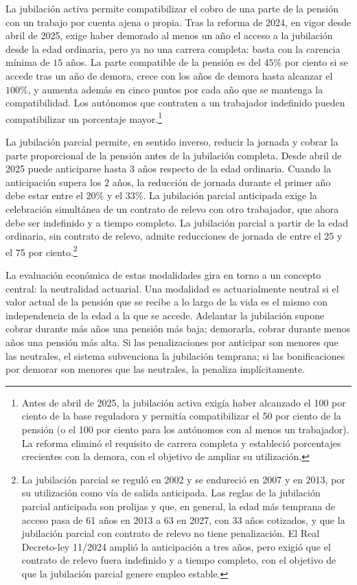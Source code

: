 \documentclass[10pt,a4paper]{article}
\begin{document}
La jubilación activa permite compatibilizar el cobro de una parte de la pensión con un trabajo por cuenta ajena o propia. Tras la reforma de 2024, en vigor desde abril de 2025, exige haber demorado al menos un año el acceso a la jubilación desde la edad ordinaria, pero ya no una carrera completa: basta con la carencia mínima de $15$ años. La parte compatible de la pensión es del $45\%$ por ciento si se accede tras un año de demora, crece con los años de demora hasta alcanzar el $100\%$, y aumenta además en cinco puntos por cada año que se mantenga la compatibilidad. Los autónomos que contraten a un trabajador indefinido pueden compatibilizar un porcentaje mayor.\footnote{%
    Antes de abril de 2025, la jubilación activa exigía haber alcanzado el 100 por ciento de la base reguladora y permitía compatibilizar el 50 por ciento de la pensión (o el 100 por ciento para los autónomos con al menos un trabajador). La reforma eliminó el requisito de carrera completa y estableció porcentajes crecientes con la demora, con el objetivo de ampliar su utilización.
}

La jubilación parcial permite, en sentido inverso, reducir la jornada y cobrar la parte proporcional de la pensión antes de la jubilación completa. Desde abril de 2025 puede anticiparse hasta $3$ años respecto de la edad ordinaria. Cuando la anticipación supera los $2$ años, la reducción de jornada durante el primer año debe estar entre el $20\%$ y el $33\%$. La jubilación parcial anticipada exige la celebración simultánea de un contrato de relevo con otro trabajador, que ahora debe ser indefinido y a tiempo completo. La jubilación parcial a partir de la edad ordinaria, sin contrato de relevo, admite reducciones de jornada de entre el 25 y el 75 por ciento.\footnote{%
    La jubilación parcial se reguló en 2002 y se endureció en 2007 y en 2013, por su utilización como vía de salida anticipada. Las reglas de la jubilación parcial anticipada son prolijas y que, en general, la edad más temprana de acceso pasa de 61 años en 2013 a 63 en 2027, con 33 años cotizados, y que la jubilación parcial con contrato de relevo no tiene penalización. El Real Decreto-ley 11/2024 amplió la anticipación a tres años, pero exigió que el contrato de relevo fuera indefinido y a tiempo completo, con el objetivo de que la jubilación parcial genere empleo estable.
}

La evaluación económica de estas modalidades gira en torno a un concepto central: la neutralidad actuarial. Una modalidad es actuarialmente neutral si el valor actual de la pensión que se recibe a lo largo de la vida es el mismo con independencia de la edad a la que se accede. Adelantar la jubilación supone cobrar durante más años una pensión más baja; demorarla, cobrar durante menos años una pensión más alta. Si las penalizaciones por anticipar son menores que las neutrales, el sistema subvenciona la jubilación temprana; si las bonificaciones por demorar son menores que las neutrales, la penaliza implícitamente.
\end{document}

